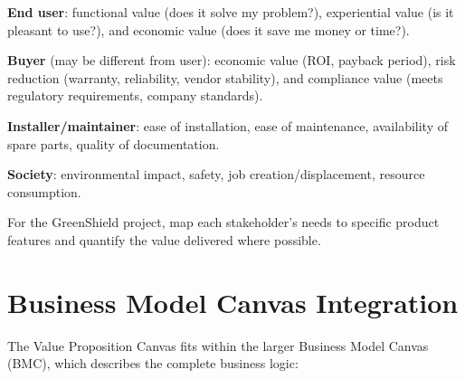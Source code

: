 \documentclass[11pt,letterpaper,twoside,openany]{book}
\begin{document}
\textbf{End user}: functional value (does it solve my problem?), experiential value (is it pleasant to use?), and economic value (does it save me money or time?).

\textbf{Buyer} (may be different from user): economic value (ROI, payback period), risk reduction (warranty, reliability, vendor stability), and compliance value (meets regulatory requirements, company standards).

\textbf{Installer/maintainer}: ease of installation, ease of maintenance, availability of spare parts, quality of documentation.

\textbf{Society}: environmental impact, safety, job creation/displacement, resource consumption.

For the GreenShield project, map each stakeholder's needs to specific product features and quantify the value delivered where possible.

\section{Business Model Canvas Integration}
The Value Proposition Canvas fits within the larger Business Model Canvas (BMC), which describes the complete business logic:
\end{document}
